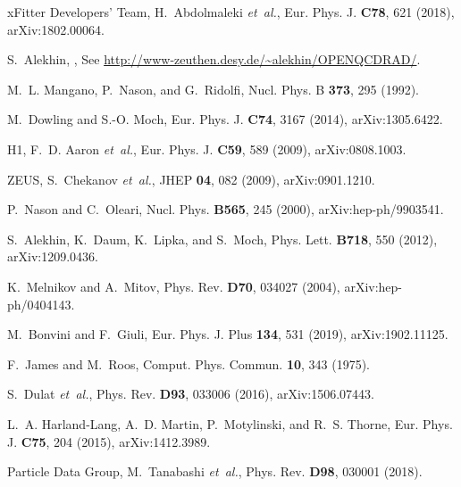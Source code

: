 \documentclass[12pt]{article}
\begin{document}
\begin{thebibliography}{99}
xFitter Developers' Team, H.~Abdolmaleki {\em et~al.},
\newblock Eur. Phys. J. {\bf C78}, 621 (2018), arXiv:1802.00064.

S.~Alekhin,
,
\newblock See \url{http://www-zeuthen.desy.de/~alekhin/OPENQCDRAD/}.

M.~L. Mangano, P.~Nason, and G.~Ridolfi,
\newblock Nucl. Phys. B {\bf 373}, 295 (1992).

M.~Dowling and S.-O. Moch,
\newblock Eur. Phys. J. {\bf C74}, 3167 (2014), arXiv:1305.6422.

H1, F.~D. Aaron {\em et~al.},
\newblock Eur. Phys. J. {\bf C59}, 589 (2009), arXiv:0808.1003.

ZEUS, S.~Chekanov {\em et~al.},
\newblock JHEP {\bf 04}, 082 (2009), arXiv:0901.1210.

P.~Nason and C.~Oleari,
\newblock Nucl. Phys. {\bf B565}, 245 (2000), arXiv:hep-ph/9903541.

S.~Alekhin, K.~Daum, K.~Lipka, and S.~Moch,
\newblock Phys. Lett. {\bf B718}, 550 (2012), arXiv:1209.0436.

K.~Melnikov and A.~Mitov,
\newblock Phys. Rev. {\bf D70}, 034027 (2004), arXiv:hep-ph/0404143.

M.~Bonvini and F.~Giuli,
\newblock Eur. Phys. J. Plus {\bf 134}, 531 (2019), arXiv:1902.11125.

F.~James and M.~Roos,
\newblock Comput. Phys. Commun. {\bf 10}, 343 (1975).

S.~Dulat {\em et~al.},
\newblock Phys. Rev. {\bf D93}, 033006 (2016), arXiv:1506.07443.

L.~A. Harland-Lang, A.~D. Martin, P.~Motylinski, and R.~S. Thorne,
\newblock Eur. Phys. J. {\bf C75}, 204 (2015), arXiv:1412.3989.

Particle Data Group, M.~Tanabashi {\em et~al.},
\newblock Phys. Rev. {\bf D98}, 030001 (2018).


\end{thebibliography}
\end{document}
